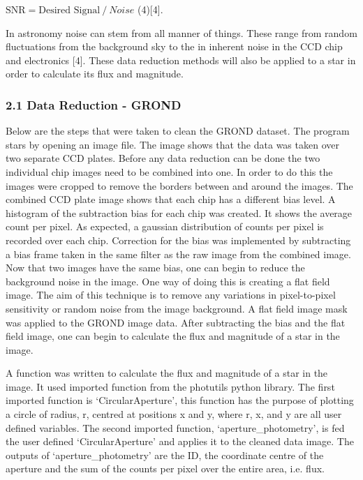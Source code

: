 \documentclass[11pt]{article}
\begin{document}
\(\text{SNR} = \text{Desired Signal}⁄Noise\) (4){[}4{]}.

In astronomy noise can stem from all manner of things. These range from
random fluctuations from the background sky to the in inherent noise in
the CCD chip and electronics {[}4{]}. These data reduction methods will
also be applied to a star in order to calculate its flux and magnitude.

    \subsubsection{2.1 Data Reduction - GROND}\label{data-reduction---grond}

Below are the steps that were taken to clean the GROND dataset. The
program stars by opening an image file. The image shows that the data
was taken over two separate CCD plates. Before any data reduction can be
done the two individual chip images need to be combined into one. In
order to do this the images were cropped to remove the borders between
and around the images. The combined CCD plate image shows that each chip
has a different bias level. A histogram of the subtraction bias for each
chip was created. It shows the average count per pixel. As expected, a
gaussian distribution of counts per pixel is recorded over each chip.
Correction for the bias was implemented by subtracting a bias frame
taken in the same filter as the raw image from the combined image. Now
that two images have the same bias, one can begin to reduce the
background noise in the image. One way of doing this is creating a flat
field image. The aim of this technique is to remove any variations in
pixel-to-pixel sensitivity or random noise from the image background. A
flat field image mask was applied to the GROND image data. After
subtracting the bias and the flat field image, one can begin to
calculate the flux and magnitude of a star in the image.

A function was written to calculate the flux and magnitude of a star in
the image. It used imported function from the photutils python library.
The first imported function is `CircularAperture', this function has the
purpose of plotting a circle of radius, r, centred at positions x and y,
where r, x, and y are all user defined variables. The second imported
function, `aperture\_photometry', is fed the user defined
`CircularAperture' and applies it to the cleaned data image. The outputs
of `aperture\_photometry' are the ID, the coordinate centre of the
aperture and the sum of the counts per pixel over the entire area, i.e.
flux.
\end{document}
